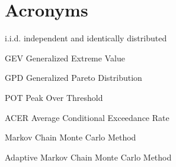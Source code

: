 
\chapter{Acronyms}
\begin{description}
\item{i.i.d.} independent and identically distributed
\item{GEV} Generalized Extreme Value
\item{GPD} Generalized Pareto Distribution
\item{POT} Peak Over Threshold
\item{ACER} Average Conditional Exceedance Rate
\item[MCMC] Markov Chain Monte Carlo Method
\item[AMCMC] Adaptive Markov Chain Monte Carlo Method
\end{description}